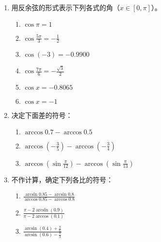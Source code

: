 \begin{enumerate}
    \item 用反余弦的形式表示下列各式的角（$x\in[0,\pi]$）。
\begin{multicols}{2}
\begin{enumerate}
    \item $\cos\pi =1$
    \item $\cos\frac{5\pi}{3}=-\frac{1}{2}$
    \item $\cos(-3)=-0.9900$
    \item $\cos\frac{7\pi}{6}=-\frac{\sqrt{3}}{2}$
    \item $\cos x=-0.8065$
    \item $\cos x=-1$
\end{enumerate}
\end{multicols}

\item 决定下面差的符号：
\begin{multicols}{2}
\begin{enumerate}
 \item $\arccos0.7-\arccos0.5$
\item $\arccos\left(-\frac{3}{5}\right)-\arccos\left(-\frac{3}{4}\right)$
\item $\arccos\left(\sin\frac{\pi}{12}\right)-\arccos\left(\sin\frac{\pi}{13}\right)$
\end{enumerate}
\end{multicols}
\item 不作计算，确定下列各比的符号：
\begin{multicols}{2}
\begin{enumerate}
    \item $\frac{\arcsin0.85-\arcsin0.8}{\arccos0.85-\arccos0.8}$
    \item $\frac{\pi -2\arcsin(0.9)}{\pi -2\arccos(0.1)}$
    \item $\frac{\arcsin(0.4)+\frac{\pi}{6}}{\arcsin(0.6)-\frac{\pi}{3}}$
\end{enumerate}
\end{multicols}


\end{enumerate}
